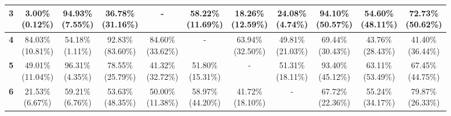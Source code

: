 \documentclass{report}
\begin{document}
\begin{center}
{\begin{tabular}{|c|c|c|c|c|c|c|c|c|c|c|}
    \textbf{3} & \makecell{3.00\% \\ (0.12\%)} & \makecell{94.93\% \\ (7.55\%)} & \makecell{36.78\% \\ (31.16\%)} & - & \makecell{58.22\% \\ (11.69\%)} & \makecell{18.26\% \\ (12.59\%)} & \makecell{24.08\% \\ (4.74\%)} & \makecell{94.10\% \\ (50.57\%)} & \makecell{54.60\% \\ (48.11\%)} & \makecell{72.73\% \\ (50.62\%)} \\ \hline
    \textbf{4} & \makecell{84.03\% \\ (10.81\%)} & \makecell{54.18\% \\ (1.11\%)} & \makecell{92.83\% \\ (83.60\%)} & \makecell{84.60\% \\ (33.62\%)} & - & \makecell{63.94\% \\ (32.50\%)} & \makecell{49.81\% \\ (21.03\%)} & \makecell{69.44\% \\ (30.43\%)} & \makecell{43.76\% \\ (28.43\%)} & \makecell{41.40\% \\ (36.44\%)} \\ \hline
    \textbf{5} & \makecell{49.01\% \\ (11.04\%)} & \makecell{96.31\% \\ (4.35\%)} & \makecell{78.55\% \\ (25.79\%)} & \makecell{41.32\% \\ (32.72\%)} & \makecell{51.80\% \\ (15.31\%)} & - & \makecell{51.31\% \\ (18.11\%)} & \makecell{93.40\% \\ (45.12\%)} & \makecell{63.11\% \\ (53.49\%)} & \makecell{67.45\% \\ (44.75\%)} \\ \hline
    \textbf{6} & \makecell{21.53\% \\ (6.67\%)} & \makecell{59.21\% \\ (6.76\%)} & \makecell{53.63\% \\ (48.35\%)} & \makecell{50.00\% \\ (11.38\%)} & \makecell{58.97\% \\ (44.20\%)} & \makecell{41.72\% \\ (18.10\%)} & - & \makecell{67.72\% \\ (22.36\%)} & \makecell{55.24\% \\ (34.17\%)} & \makecell{79.87\% \\ (26.33\%)} \\ \hline

\end{tabular}}
\end{center}
\end{document}
